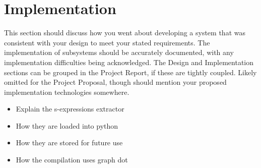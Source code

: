 
\chapter{Implementation}

This section should discuss how you went about developing a system that was
consistent with your design to meet your stated requirements. The
implementation of subsystems should be accurately documented, with any
implementation difficulties being acknowledged. The Design and Implementation
sections can be grouped in the Project Report, if these are tightly coupled.
Likely omitted for the Project Proposal, though should mention your proposed
implementation technologies somewhere.


\begin{itemize}
\item Explain the s-expressions extractor
\item How they are loaded into python 
\item How they are stored for future use 
\item How the compilation uses graph dot
\end{itemize}

